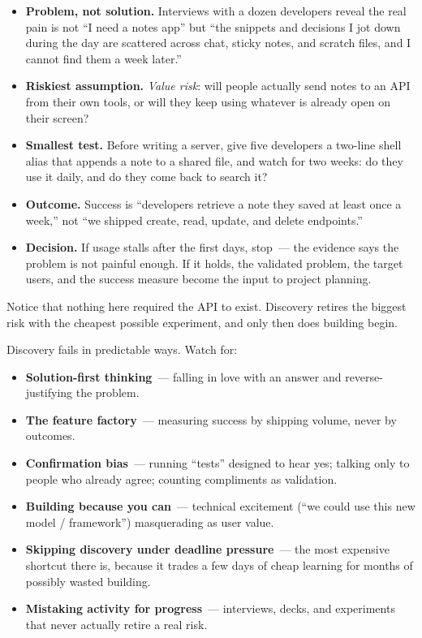 \begin{itemize}
\tightlist
\item
  \textbf{Problem, not solution.} Interviews with a dozen developers reveal the real pain is not ``I need
  a notes app'' but ``the snippets and decisions I jot down during the day are scattered across chat,
  sticky notes, and scratch files, and I cannot find them a week later.''
\item
  \textbf{Riskiest assumption.} \emph{Value risk}: will people actually send notes to an API from their own
  tools, or will they keep using whatever is already open on their screen?
\item
  \textbf{Smallest test.} Before writing a server, give five developers a two-line shell alias that
  appends a note to a shared file, and watch for two weeks: do they use it daily, and do they
  come back to search it?
\item
  \textbf{Outcome.} Success is ``developers retrieve a note they saved at least once a week,'' not ``we
  shipped create, read, update, and delete endpoints.''
\item
  \textbf{Decision.} If usage stalls after the first days, stop~--- the evidence says the problem is not
  painful enough. If it holds, the validated problem, the target users, and the success measure
  become the input to project planning.
\end{itemize}

\noindent{}Notice that nothing here required the API to exist. Discovery retires the biggest risk with the
cheapest possible experiment, and only then does building begin.

\label{product-discovery:common-traps}

Discovery fails in predictable ways. Watch for:

\begin{itemize}
\tightlist
\item
  \textbf{Solution-first thinking}~--- falling in love with an answer and reverse-justifying the problem.
\item
  \textbf{The feature factory}~--- measuring success by shipping volume, never by outcomes.
\item
  \textbf{Confirmation bias}~--- running ``tests'' designed to hear yes; talking only to people who already
  agree; counting compliments as validation.
\item
  \textbf{Building because you can}~--- technical excitement (``we could use this new model / framework'')
  masquerading as user value.
\item
  \textbf{Skipping discovery under deadline pressure}~--- the most expensive shortcut there is, because it
  trades a few days of cheap learning for months of possibly wasted building.
\item
  \textbf{Mistaking activity for progress}~--- interviews, decks, and experiments that never actually
  retire a real risk.
\end{itemize}

